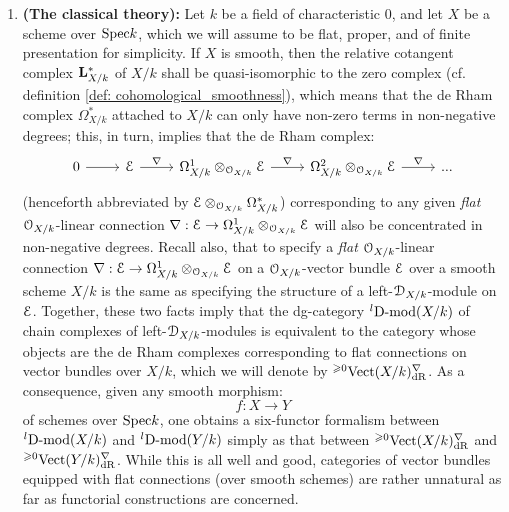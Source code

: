             \begin{enumerate}
                \item \textbf{(The classical theory):} Let $k$ be a field of characteristic $0$, and let $X$ be a scheme over $\mathrm{Spec} k$, which we will assume to be flat, proper, and of finite presentation for simplicity. If $X$ is smooth, then the relative cotangent complex $\mathbf{L}^*_{X/k}$ of $X/k$ shall be quasi-isomorphic to the zero complex (cf. definition \ref{def: cohomological_smoothness}), which means that the de Rham complex $\Omega^*_{X/k}$ attached to $X/k$ can only have non-zero terms in non-negative degrees; this, in turn, implies that the de Rham complex:
                    $$
                        \begin{tikzcd}
                        	0 & \E & {\Omega^1_{X/k} \tensor_{\calO_{X/k}} \E} & {\Omega^2_{X/k} \tensor_{\calO_{X/k}} \E} & {...}
                        	\arrow["\nabla", from=1-4, to=1-5]
                        	\arrow["\nabla", from=1-3, to=1-4]
                        	\arrow["\nabla", from=1-2, to=1-3]
                        	\arrow[from=1-1, to=1-2]
                        \end{tikzcd}
                    $$
                (henceforth abbreviated by $\E \tensor_{\calO_{X/k}} \Omega^*_{X/k}$) corresponding to any given \textit{flat} $\mathcal{O}_{X/k}$-linear connection $\nabla: \E \to \Omega^1_{X/k} \tensor_{\calO_{X/k}} \E$ will also be concentrated in non-negative degrees. Recall also, that to specify a \textit{flat} $\mathcal{O}_{X/k}$-linear connection $\nabla: \E \to \Omega^1_{X/k} \tensor_{\calO_{X/k}} \E$ on a $\mathcal{O}_{X/k}$-vector bundle $\mathcal{E}$ over a smooth scheme $X/k$ is the same as specifying the structure of a left-$\mathcal{D}_{X/k}$-module on $\mathcal{E}$. Together, these two facts imply that the dg-category ${}^l\mathrm{D}\text{-}\mathrm{mod}(X/k)$ of chain complexes of left-$\mathcal{D}_{X/k}$-modules is equivalent to the category whose objects are the de Rham complexes corresponding to flat connections on vector bundles over $X/k$, which we will denote by ${}^{\geqslant 0}\mathrm{Vect}(X/k)^{\nabla}_{\mathrm{dR}}$. As a consequence, given any smooth morphism:
                    $$f: X \to Y$$
                of schemes over $\mathrm{Spec} k$, one obtains a six-functor formalism between ${}^l\mathrm{D}\text{-}\mathrm{mod}(X/k)$ and ${}^l\mathrm{D}\text{-}\mathrm{mod}(Y/k)$ simply as that between ${}^{\geqslant 0}\mathrm{Vect}(X/k)^{\nabla}_{\mathrm{dR}}$ and ${}^{\geqslant 0}\mathrm{Vect}(Y/k)^{\nabla}_{\mathrm{dR}}$. While this is all well and good, categories of vector bundles equipped with flat connections (over smooth schemes) are rather unnatural as far as functorial constructions are concerned. 
                

\end{enumerate}
